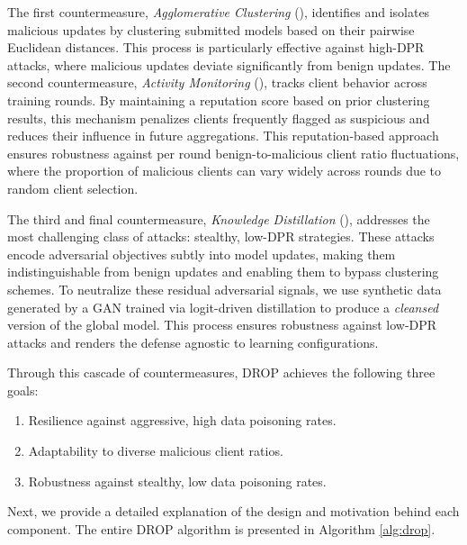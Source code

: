 The first countermeasure, \textit{Agglomerative Clustering} (), identifies and isolates malicious updates by clustering submitted models based on their pairwise Euclidean distances.
This process is particularly effective against high-DPR attacks, where malicious updates deviate significantly from benign updates.  
%
The second countermeasure, \textit{Activity Monitoring} (), tracks client behavior across training rounds. By maintaining a reputation score based on prior clustering results, this mechanism penalizes clients frequently flagged as suspicious and reduces their influence in future aggregations. This reputation-based approach ensures robustness against per round benign-to-malicious client ratio fluctuations, where the proportion of malicious clients can vary widely across rounds due to random client selection.  

The third and final countermeasure, \textit{Knowledge Distillation} (), addresses the most challenging class of attacks: stealthy, low-DPR strategies. These attacks encode adversarial objectives subtly into model updates, making them indistinguishable from benign updates and enabling them to bypass clustering schemes. To neutralize these residual adversarial signals, we use synthetic data generated by a GAN trained via logit-driven distillation to produce a \textit{cleansed} version of the global model. This process ensures robustness against low-DPR attacks and renders the defense agnostic to learning configurations.

Through this cascade of countermeasures, DROP achieves the following three goals:  
\begin{enumerate}
    \item Resilience against aggressive, high data poisoning rates.
    \item Adaptability to diverse malicious client ratios.
    \item Robustness against stealthy, low data poisoning rates.  
\end{enumerate}
Next, we provide a detailed explanation of the design and motivation behind each component. The entire DROP algorithm is presented in Algorithm \ref{alg:drop}. 

